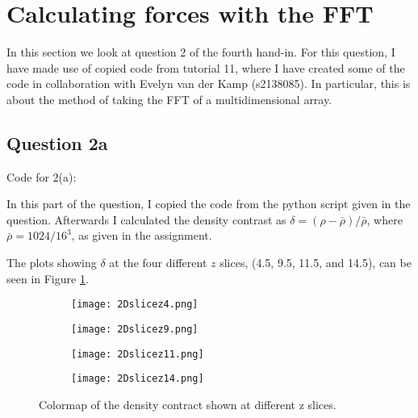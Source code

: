 \section{Calculating forces with the FFT}

In this section we look at question 2 of the fourth hand-in. 
For this question, I have made use of copied code from tutorial 11, where I have created some of the code in collaboration with Evelyn van der Kamp (s2138085). 
In particular, this is about the method of taking the FFT of a multidimensional array. 

\subsection{Question 2a}

Code for 2(a):


In this part of the question, I copied the code from the python script given in the question.
Afterwards I calculated the density contrast as $\delta = (\rho - \bar{\rho})/\bar{\rho}$, where $\bar{\rho} = 1024/16^3$, as given in the assignment.

The plots showing $\delta$ at the four different $z$ slices, (4.5, 9.5, 11.5, and 14.5), can be seen in Figure \ref{fig:2Dslicea}.

\begin{figure}[ht!]
\begin{center}
        \begin{subfigure}{.49\textwidth}
      \centering
      \texttt{[image: 2Dslicez4.png]}
    \end{subfigure}
    \begin{subfigure}{.49\textwidth}
      \centering
      \texttt{[image: 2Dslicez9.png]}
    \end{subfigure}
    \begin{subfigure}{.49\textwidth}
      \centering
      \texttt{[image: 2Dslicez11.png]}
    \end{subfigure}
    \begin{subfigure}{.49\textwidth}
      \centering
      \texttt{[image: 2Dslicez14.png]}
    \end{subfigure}
    \caption{Colormap of the density contract shown at different z slices.}
    \label{fig:2Dslicea}
\end{center}
\end{figure}


